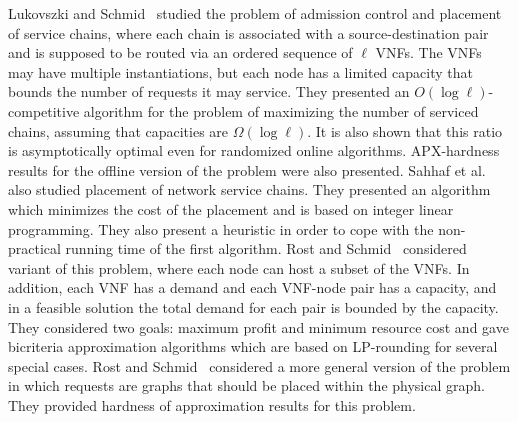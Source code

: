 Lukovszki and Schmid~\cite{LukovszkiSchmid15} studied the problem of
admission control and placement of service chains, where each chain is
associated with a source-destination pair and is supposed to be routed
via an ordered sequence of $\ell$ VNFs.  The VNFs may have multiple
instantiations, but each node has a limited capacity that bounds the
number of requests it may service.
%
They presented an $O(\log \ell)$-competitive algorithm for the problem
of maximizing the number of serviced chains, assuming that capacities
are $\Omega(\log \ell)$.
It is also shown that this ratio is asymptotically optimal even for
randomized online algorithms.  APX-hardness results for the offline
version of the problem were also presented.
%
Sahhaf et al.~\cite{STRSCPD15} also studied placement of network
service chains.  They presented an algorithm which minimizes the cost
of the placement and is based on integer linear programming.  They
also present a heuristic in order to cope with the non-practical
running time of the first algorithm.
%
Rost and Schmid~\cite{RostSchmid16} considered variant of this
problem, where each node can host a subset of the VNFs.  In addition,
each VNF has a demand and each VNF-node pair has a capacity, and in a
feasible solution the total demand for each pair is bounded by the
capacity.  They considered two goals: maximum profit and minimum
resource cost and gave bicriteria approximation algorithms which are
based on LP-rounding for several special cases.
%
Rost and Schmid~\cite{RostSchmid18} considered a more general version
of the problem in which requests are graphs that should be placed
within the physical graph.  They provided hardness of approximation
results for this problem.


